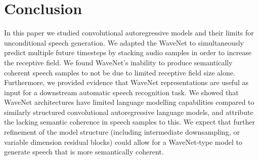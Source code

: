 \section{Conclusion}
In this paper we studied convolutional autoregressive models and their limits for unconditional speech generation. 
We adapted the WaveNet to simultaneously predict multiple future timesteps by stacking audio samples in order to increase the receptive field. 
We found WaveNet's inability to produce semantically coherent speech samples to not be due to limited receptive field size alone. 
Furthermore, we provided evidence that WaveNet representations are useful as input for a downstream automatic speech recognition task. 
We showed that WaveNet architectures have limited language modelling capabilities compared to similarly structured convolutional autoregressive language models, and attribute the lacking semantic coherence in speech samples to this. 
We expect that further refinement of the model structure (including intermediate downsampling, or variable dimension residual blocks) could allow for a WaveNet-type model to generate speech that is more semantically coherent. 

    